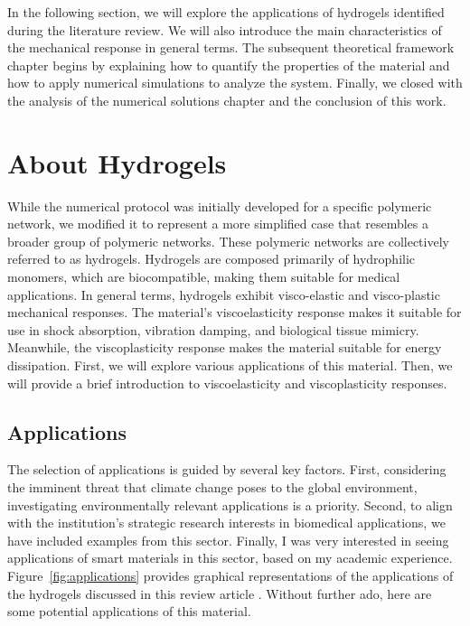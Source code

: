 In the following section, we will explore the applications of hydrogels identified during the literature review. 
We will also introduce the main characteristics of the mechanical response in general terms.
The subsequent theoretical framework chapter begins by explaining how to quantify the properties of the material and how to apply numerical simulations to analyze the system.
Finally, we closed with the analysis of the numerical solutions chapter and the conclusion of this work.

\section{About Hydrogels}

While the numerical protocol was initially developed for a specific polymeric network, we modified it to represent a more simplified case that resembles a broader group of polymeric networks.
These polymeric networks are collectively referred to as hydrogels.
Hydrogels\citep{choiSynthesisHydrogelBasedMicrogels2025} are composed primarily of hydrophilic monomers, which are biocompatible, making them suitable for medical applications.
In general terms, hydrogels exhibit visco-elastic and visco-plastic mechanical responses.
The material's viscoelasticity response makes it suitable for use in shock absorption, vibration damping, and biological tissue mimicry.
Meanwhile, the viscoplasticity response makes the material suitable for energy dissipation.
First, we will explore various applications of this material.
Then, we will provide a brief introduction to viscoelasticity and viscoplasticity responses.

\subsection{Applications}

The selection of applications is guided by several key factors. 
First, considering the imminent threat that climate change poses to the global environment, investigating environmentally relevant applications is a priority.
Second, to align with the institution's strategic research interests in biomedical applications, we have included examples from this sector.
Finally, I was very interested in seeing applications of smart materials in this sector, based on my academic experience.
Figure~\ref{fig:applications} provides graphical representations of the applications of the hydrogels discussed in this review article \citep{petelinsekToughHydrogelsLoadBearing2024}.
Without further ado, here are some potential applications of this material.

